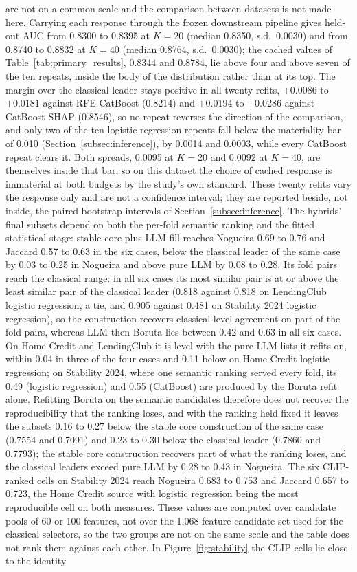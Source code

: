\documentclass[final,5p,twocolumn]{elsarticle}
\newcommand{\Kfeat}{K}
\begin{document}
are not on a common scale and the comparison between datasets is not made here. Carrying each response through the frozen downstream pipeline gives held-out AUC from 0.8300 to 0.8395 at $\Kfeat=20$ (median 0.8350, s.d.\ 0.0030) and from 0.8740 to 0.8832 at $\Kfeat=40$ (median 0.8764, s.d.\ 0.0030); the cached values of Table~\ref{tab:primary_results}, 0.8344 and 0.8784, lie above four and above seven of the ten repeats, inside the body of the distribution rather than at its top. The margin over the classical leader stays positive in all twenty refits, $+0.0086$ to $+0.0181$ against RFE CatBoost (0.8214) and $+0.0194$ to $+0.0286$ against CatBoost SHAP (0.8546), so no repeat reverses the direction of the comparison, and only two of the ten logistic-regression repeats fall below the materiality bar of 0.010 (Section~\ref{subsec:inference}), by 0.0014 and 0.0003, while every CatBoost repeat clears it. Both spreads, 0.0095 at $\Kfeat=20$ and 0.0092 at $\Kfeat=40$, are themselves inside that bar, so on this dataset the choice of cached response is immaterial at both budgets by the study's own standard. These twenty refits vary the response only and are not a confidence interval; they are reported beside, not inside, the paired bootstrap intervals of Section~\ref{subsec:inference}. The hybrids' final subsets depend on both the per-fold semantic ranking and the fitted statistical stage: stable core plus LLM fill reaches Nogueira 0.69 to 0.76 and Jaccard 0.57 to 0.63 in the six cases, below the classical leader of the same case by 0.03 to 0.25 in Nogueira and above pure LLM by 0.08 to 0.28. Its fold pairs reach the classical range: in all six cases its most similar pair is at or above the least similar pair of the classical leader (0.818 against 0.818 on LendingClub logistic regression, a tie, and 0.905 against 0.481 on Stability 2024 logistic regression), so the construction recovers classical-level agreement on part of the fold pairs, whereas LLM then Boruta lies between 0.42 and 0.63 in all six cases. On Home Credit and LendingClub it is level with the pure LLM lists it refits on, within 0.04 in three of the four cases and 0.11 below on Home Credit logistic regression; on Stability 2024, where one semantic ranking served every fold, its 0.49 (logistic regression) and 0.55 (CatBoost) are produced by the Boruta refit alone. Refitting Boruta on the semantic candidates therefore does not recover the reproducibility that the ranking loses, and with the ranking held fixed it leaves the subsets 0.16 to 0.27 below the stable core construction of the same case (0.7554 and 0.7091) and 0.23 to 0.30 below the classical leader (0.7860 and 0.7793); the stable core construction recovers part of what the ranking loses, and the classical leaders exceed pure LLM by 0.28 to 0.43 in Nogueira. The six CLIP-ranked cells on Stability 2024 reach Nogueira 0.683 to 0.753 and Jaccard 0.657 to 0.723, the Home Credit source with logistic regression being the most reproducible cell on both measures. These values are computed over candidate pools of 60 or 100 features, not over the 1,068-feature candidate set used for the classical selectors, so the two groups are not on the same scale and the table does not rank them against each other. In Figure~\ref{fig:stability} the CLIP cells lie close to the identity 
\end{document}
